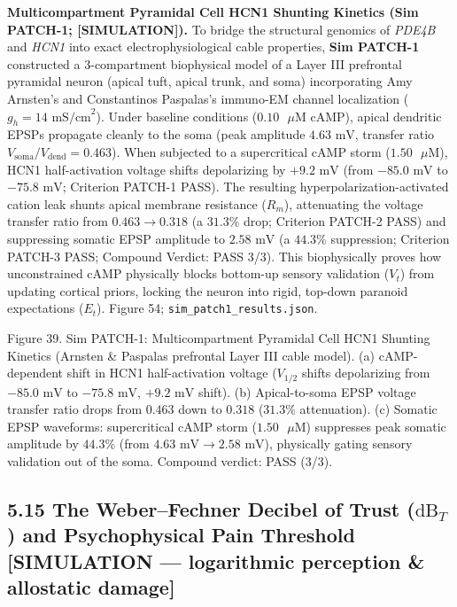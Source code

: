 \documentclass[
]{article}
\begin{document}
\textbf{Multicompartment Pyramidal Cell HCN1 Shunting Kinetics (Sim
PATCH-1; {[}SIMULATION{]}).} To bridge the structural genomics of
\emph{PDE4B} and \emph{HCN1} into exact electrophysiological cable
properties, \textbf{Sim PATCH-1} constructed a 3-compartment biophysical
model of a Layer III prefrontal pyramidal neuron (apical tuft, apical
trunk, and soma) incorporating Amy Arnsten's and Constantinos Paspalas's
immuno-EM channel localization (\(g_h = 14\text{ mS/cm}^2\)). Under
baseline conditions (\(0.10\text{ }\mu\text{M}\) cAMP), apical dendritic
EPSPs propagate cleanly to the soma (peak amplitude \(4.63\text{ mV}\),
transfer ratio \(V_{\mathrm{soma}} / V_{\mathrm{dend}} = 0.463\)). When
subjected to a supercritical cAMP storm (\(1.50\text{ }\mu\text{M}\)),
HCN1 half-activation voltage shifts depolarizing by \(+9.2\text{ mV}\)
(from \(-85.0\text{ mV}\) to \(-75.8\text{ mV}\); Criterion PATCH-1
PASS). The resulting hyperpolarization-activated cation leak shunts
apical membrane resistance (\(R_m\)), attenuating the voltage transfer
ratio from \(0.463 \to 0.318\) (a \(31.3\%\) drop; Criterion PATCH-2
PASS) and suppressing somatic EPSP amplitude to \(2.58\text{ mV}\) (a
\(44.3\%\) suppression; Criterion PATCH-3 PASS; Compound Verdict: PASS
3/3). This biophysically proves how unconstrained cAMP physically blocks
bottom-up sensory validation (\(V_t\)) from updating cortical priors,
locking the neuron into rigid, top-down paranoid expectations (\(E_t\)).
Figure 54; \texttt{sim\_patch1\_results.json}.

Figure 39. Sim PATCH-1: Multicompartment Pyramidal Cell HCN1 Shunting
Kinetics (Arnsten \& Paspalas prefrontal Layer III cable model). (a)
cAMP-dependent shift in HCN1 half-activation voltage (\(V_{1/2}\) shifts
depolarizing from \(-85.0\text{ mV}\) to \(-75.8\text{ mV}\),
\(+9.2\text{ mV}\) shift). (b) Apical-to-soma EPSP voltage transfer
ratio drops from \(0.463\) down to \(0.318\) (\(31.3\%\) attenuation).
(c) Somatic EPSP waveforms: supercritical cAMP storm
(\(1.50\text{ }\mu\text{M}\)) suppresses peak somatic amplitude by
\(44.3\%\) (from \(4.63\text{ mV} \to 2.58\text{ mV}\)), physically
gating sensory validation out of the soma. Compound verdict: PASS (3/3).

\subsection{\texorpdfstring{5.15 The Weber--Fechner Decibel of Trust
(\(\text{dB}_T\)) and Psychophysical Pain Threshold {[}SIMULATION ---
logarithmic perception \& allostatic
damage{]}}{5.15 The Weber--Fechner Decibel of Trust (\textbackslash text\{dB\}\_T) and Psychophysical Pain Threshold {[}SIMULATION --- logarithmic perception \& allostatic damage{]}}}\label{the-weberfechner-decibel-of-trust-textdb_t-and-psychophysical-pain-threshold-simulation-logarithmic-perception-allostatic-damage}
\end{document}
